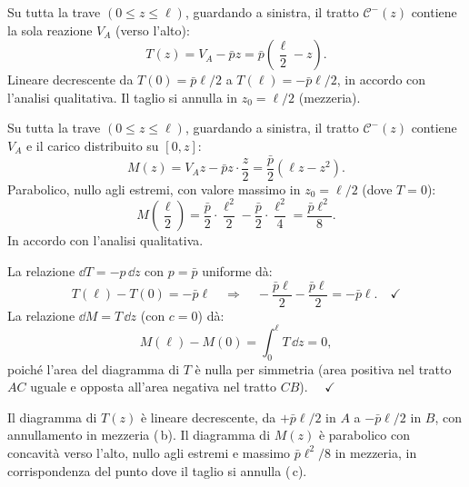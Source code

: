 \begin{esempio}
\begin{svolgimento}
		
		Su tutta la trave $(0 \leq z \leq \ell)$,
		guardando a sinistra, il tratto $\mathcal{C}^-(z)$
		contiene la sola reazione $V_A$ (verso l'alto):
		\[
		T(z) = V_A - \bar{p}z
		= \bar{p}\!\left(\frac{\ell}{2} - z\right).
		\]
		Lineare decrescente da $T(0) = \bar{p}\ell/2$
		a $T(\ell) = -\bar{p}\ell/2$, in accordo con
		l'analisi qualitativa. Il taglio si annulla in
		$z_0 = \ell/2$ (mezzeria).
		
		
		Su tutta la trave $(0 \leq z \leq \ell)$,
		guardando a sinistra, il tratto $\mathcal{C}^-(z)$
		contiene $V_A$ e il carico distribuito su $[0,z]$:
		\[
		M(z) = V_A z - \bar{p}z\cdot\frac{z}{2}
		= \frac{\bar{p}}{2}\!\left(\ell z - z^2\right).
		\]
		Parabolico, nullo agli estremi, con valore
		massimo in $z_0 = \ell/2$ (dove $T = 0$):
		\[
		M\!\left(\frac{\ell}{2}\right)
		= \frac{\bar{p}}{2}\cdot\frac{\ell^2}{2}
		- \frac{\bar{p}}{2}\cdot\frac{\ell^2}{4}
		= \frac{\bar{p}\ell^2}{8}.
		\]
		In accordo con l'analisi qualitativa.
		
		La relazione $\dd T = -p\,\dd z$ con $p = \bar{p}$
		uniforme dà:
		\[
		T(\ell) - T(0) = -\bar{p}\ell
		\quad\Rightarrow\quad
		-\frac{\bar{p}\ell}{2} - \frac{\bar{p}\ell}{2}
		= -\bar{p}\ell. \quad\checkmark
		\]
		La relazione $\dd M = T\,\dd z$ (con $c = 0$) dà:
		\[
		M(\ell) - M(0) = \int_0^\ell T\,\dd z = 0,
		\]
		poiché l'area del diagramma di $T$ è nulla
		per simmetria (area positiva nel tratto $AC$
		uguale e opposta all'area negativa nel tratto
		$CB$). $\quad\checkmark$
		
		\noindent
		Il diagramma di $T(z)$ è lineare decrescente,
		da $+\bar{p}\ell/2$ in $A$ a $-\bar{p}\ell/2$
		in $B$, con annullamento in mezzeria (\,b).
		Il diagramma di $M(z)$ è parabolico con
		concavità verso l'alto, nullo
		agli estremi e massimo $\bar{p}\ell^2/8$
		in mezzeria, in corrispondenza del punto
		dove il taglio si annulla (\,c).
		
	\end{svolgimento}
\end{esempio}



